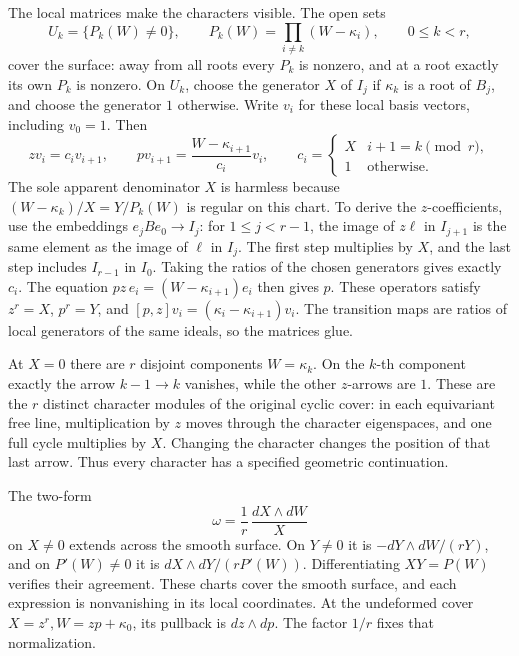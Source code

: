 The local matrices make the characters visible. The open sets
\[
 U_k=\{P_k(W)\ne0\},\qquad
 P_k(W)=\prod_{i\ne k}(W-\kappa_i),\qquad 0\leq k<r,
\]
cover the surface: away from all roots every \(P_k\) is nonzero,
and at a root exactly its own \(P_k\) is nonzero.
On \(U_k\), choose the generator \(X\) of \(I_j\) if \(\kappa_k\)
is a root of \(B_j\), and choose the generator \(1\) otherwise.
Write \(v_i\) for these local basis vectors, including \(v_0=1\).
Then
\begin{equation}\label{eq:cs-all-matrices}
 zv_i=c_i v_{i+1},\qquad
 pv_{i+1}=\frac{W-\kappa_{i+1}}{c_i}v_i,\qquad
 c_i=\begin{cases}X&i+1=k\pmod r,\\1&\text{otherwise.}\end{cases}
\end{equation}
The sole apparent denominator \(X\) is harmless because
\((W-\kappa_k)/X=Y/P_k(W)\) is regular on this chart.
To derive the \(z\)-coefficients, use the embeddings
\(e_jBe_0\to I_j\): for \(1\leq j<r-1\), the image of \(z\ell\)
in \(I_{j+1}\) is the same element as the image of \(\ell\)
in \(I_j\). The first step multiplies by \(X\), and the last
step includes \(I_{r-1}\) in \(I_0\).
Taking the ratios of the chosen generators gives exactly \(c_i\).
The equation \(pz\,e_i=(W-\kappa_{i+1})e_i\) then gives \(p\).
These operators satisfy \(z^r=X\), \(p^r=Y\), and
\([p,z]v_i=(\kappa_i-\kappa_{i+1})v_i\).
The transition maps are ratios of local generators of the same
ideals, so the matrices glue.

At \(X=0\) there are \(r\) disjoint components \(W=\kappa_k\).
On the \(k\)-th component exactly the arrow \(k-1\to k\)
vanishes, while the other \(z\)-arrows are \(1\).
These are the \(r\) distinct character modules of the original
cyclic cover: in each equivariant free line, multiplication by
\(z\) moves through the character eigenspaces, and one full
cycle multiplies by \(X\). Changing the character changes the
position of that last arrow. Thus every character has a specified
geometric continuation.

The two-form
\begin{equation}\label{eq:cs-volume}
 \omega=\frac1r\,\frac{dX\wedge dW}{X}
\end{equation}
on \(X\ne0\) extends across the smooth surface. On \(Y\ne0\)
it is \(-dY\wedge dW/(rY)\), and on \(P'(W)\ne0\) it is
\(dX\wedge dY/(rP'(W))\). Differentiating \(XY=P(W)\) verifies
their agreement. These charts cover the smooth surface, and each
expression is nonvanishing in its local coordinates.
At the undeformed cover \(X=z^r,W=zp+\kappa_0\), its pullback
is \(dz\wedge dp\). The factor \(1/r\) fixes that normalization.

